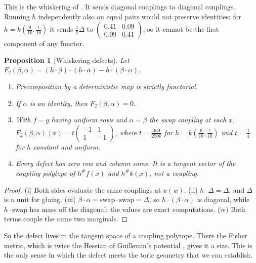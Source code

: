 \documentclass[11pt]{article}
\newtheorem{proposition}[theorem]{Proposition}
\theoremstyle{definition}
\theoremstyle{remark}
\begin{document}
This is the whiskering of \cite[Thm.~2.3(ii)]{Conditionals}. It sends diagonal couplings to diagonal
couplings. Running $h$ independently also on equal pairs would not preserve identities: for
$h=k(\tfrac9{10},\tfrac1{10})$ it sends $\tfrac12\Delta$ to
$\left(\begin{smallmatrix}0.41&0.09\\0.09&0.41\end{smallmatrix}\right)$, so it cannot be the first component
of any functor.

\begin{proposition}[Whiskering defects]\label{prop:defect}
Let $F_2(\beta,\alpha)=(h\cdot\beta)\cdot(h\cdot\alpha)-h\cdot(\beta\cdot\alpha)$.
\begin{enumerate}[label=(\roman*)]
\item Precomposition by a deterministic map is strictly functorial.
\item If $\alpha$ is an identity, then $F_2(\beta,\alpha)=0$.
\item With $f=g$ having uniform rows and $\alpha=\beta$ the swap coupling at each $x$,
  $F_2(\beta,\alpha)(x)=t\left(\begin{smallmatrix}-1&1\\1&-1\end{smallmatrix}\right)$, where $t=\tfrac{369}{2500}$ for
  $h=k(\tfrac9{10},\tfrac1{10})$ and $t=\tfrac14$ for $h$ constant and uniform.
\item Every defect has zero row and column sums. It is a tangent vector of the coupling polytope of
  $h^\#f(x)$ and $h^\#k(x)$, not a coupling.
\end{enumerate}
\end{proposition}
\begin{proof}
(i) Both sides evaluate the same couplings at $u(w)$. (ii) $h\cdot\Delta=\Delta$, and $\Delta$ is a unit for
gluing. (iii) $\beta\cdot\alpha=\mathrm{swap}\cdot\mathrm{swap}=\Delta$, so $h\cdot(\beta\cdot\alpha)$ is diagonal,
while $h\cdot\mathrm{swap}$ has mass off the diagonal; the values are exact computations. (iv) Both terms
couple the same two marginals.
\end{proof}

So the defect lives in the tangent space of a coupling polytope. There the Fisher metric, which is
twice the Hessian of Guillemin's potential \cite[Prop.~6.5]{Conditionals}, gives it a size. This is the
only sense in which the defect meets the toric geometry that we can establish.

\end{document}
